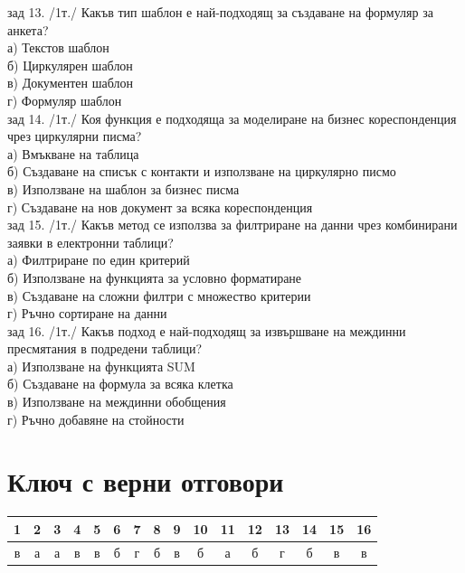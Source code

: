 % 
зад 13. /1т./ Какъв тип шаблон е най-подходящ за създаване на формуляр за анкета?\\
а) Текстов шаблон \\
б) Циркулярен шаблон\\
в) Документен шаблон\\
г) Формуляр шаблон\\

% 
% 
зад 14. /1т./ Коя функция е подходяща за моделиране на бизнес кореспонденция чрез циркулярни писма?\\
а) Вмъкване на таблица \\
б) Създаване на списък с контакти и използване на циркулярно писмо\\
в) Използване на шаблон за бизнес писма\\
г) Създаване на нов документ за всяка кореспонденция\\

% 
зад 15. /1т./ Какъв метод се използва за филтриране на данни чрез комбинирани заявки в електронни таблици?\\
а) Филтриране по един критерий\\
б) Използване на функцията за условно форматиране\\
в) Създаване на сложни филтри с множество критерии\\
г) Ръчно сортиране на данни\\

% 
% 
зад 16. /1т./ Какъв подход е най-подходящ за извършване на междинни пресмятания в подредени таблици?\\
а) Използване на функцията SUM\\
б) Създаване на формула за всяка клетка\\
в) Използване на междинни обобщения\\
г) Ръчно добавяне на стойности\\

\section{Ключ с верни отговори}
\begin{center}
    \begin{tabular}{|c|c|c|c|c|c|c|c|c|c|c|c|c|c|c|c|}
        \hline
        1 & 2 & 3 & 4 & 5 & 6 & 7 & 8 & 9 & 10 & 11 & 12 & 13 & 14 & 15 & 16 \\
        \hline
        в & а & а & в & в & б & г & б & в & б  & а  & б  & г  & б  & в  & в  \\
        \hline
    \end{tabular}
\end{center}

